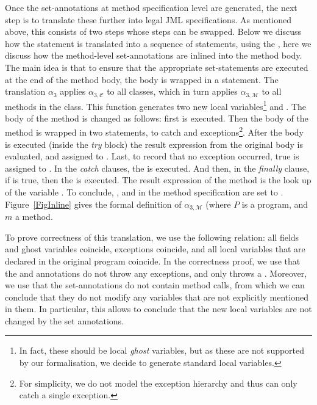 Once the set-annotations at method specification level are generated,
the next step is to translate these further into legal JML
specifications. As mentioned above, this consists of two steps whose
steps can be swapped. Below we discuss how the \CaseJML statement is
translated into a sequence of \Set statements, using the \CondExpr,
here we discuss how the method-level set-annotations are inlined into
the method body. The main idea is that to ensure that the appropriate
set-statements are executed at the end of the method body, the body is
wrapped in a \TryCatch statement. The translation \(\alpha_3\) applies
\(\alpha_{3, \mathcal{C}}\) to all classes, which in turn applies
\(\alpha_{3, \mathcal{M}}\) to all methods in the class. This function
generates two new local variables\footnote{In fact, these should be
local \emph{ghost} variables, but as these are not supported by our
formalisation, we decide to generate standard local variables.} \resl
and \exl. The body of the method is changed as follows: first \preset
is executed. Then the body of the method is wrapped in two \TryCatch
statements, to catch \Throwable and \NullPointer
exceptions\footnote{For simplicity, we do not model the exception
hierarchy and thus \TryCatch can only catch a single
exception.}. After the body is executed (inside the \emph{try} block)
the result expression from the original body is evaluated, and
assigned to \resl. Last, to record that no exception occurred, true is
assigned to \exl. In the \emph{catch} clauses, the \excset is
executed. And then, in the \emph{finally} clause, if \resl is true,
then the \postset is executed. The result expression of the method is
the look up of the variable \resl. To conclude, \preset, \postset and
\excset in the method specification are set to
\Skip. Figure~\ref{FigInline} gives the formal definition of
\(\alpha_{3, \mathcal{M}}\) (where \(P\) is a program, and \(m\) a method.

To prove correctness of this translation, we use the following
relation: all fields and ghost variables coincide, exceptions
coincide, and all local variables that are declared in the original
program coincide. In the correctness proof, we use that the \postset
and \excset annotations do not throw any exceptions, and \preset only
throws a \JMLExc. Moreover, we use that the set-annotations do not
contain method calls, from which we can conclude that they do not
modify any variables that are not explicitly mentioned in them. In
particular, this allows to conclude that the new local variables are
not changed by the set annotations.

